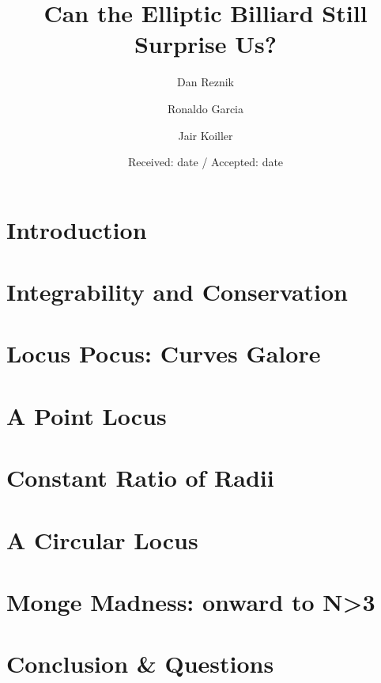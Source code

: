 \documentclass{svjour3}
\begin{document}
\title{Can the Elliptic Billiard Still Surprise Us?}
\author{Dan Reznik \and Ronaldo Garcia \and Jair Koiller}


\date{Received: date / Accepted: date}

\maketitle



\section{Introduction}
\label{sec:intro}


\section{Integrability and Conservation}
\label{sec:integrability}


\section{Locus Pocus: Curves Galore}
\label{sec:loci}


\section{A Point Locus}
\label{sec:mitten}


\section{Constant Ratio of Radii}
\label{sec:cosines}


\section{A Circular Locus}
\label{sec:circles}


\section{Monge Madness: onward to N>3}
\label{sec:generalize}


\section{Conclusion \& Questions}
\label{sec:conclusion}




 
 
\end{document}
